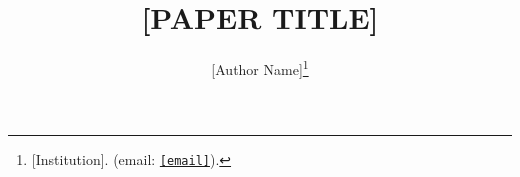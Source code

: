 \documentclass{Class}
\begin{document}
\raggedbottom
\title{[PAPER TITLE] \\ [Subtitle]}
\author{[Author Name]\footnote{[Institution]. (email: \texttt{\href{mailto:[email]}{[email]}}).}}


\maketitle
{}











\newpage

\end{document}
